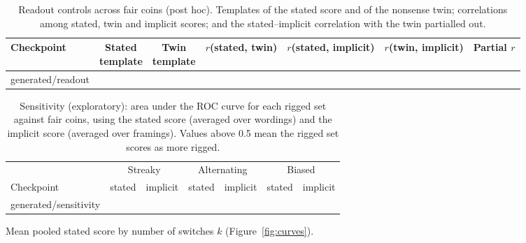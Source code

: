 \documentclass[11pt]{article}
\makeatletter
\newcommand*{\rows}[1]{\@@input #1 }
\makeatother
\begin{document}
\begin{table}[H]
\centering
\footnotesize
\caption{Readout controls across fair coins (post hoc). Templates of the stated score and of the nonsense twin; correlations among stated, twin and implicit scores; and the stated--implicit correlation with the twin partialled out.}
\label{tab:readout}
\begin{tabular}{@{}lcccccc@{}}
\toprule
Checkpoint & \makecell{Stated\\template} & \makecell{Twin\\template} & \makecell{$r$(stated,\\twin)} & \makecell{$r$(stated,\\implicit)} & \makecell{$r$(twin,\\implicit)} & \makecell{Partial\\$r$} \\
\midrule
\rows{generated/readout}
\bottomrule
\end{tabular}
\end{table}

\begin{table}[H]
\centering
\footnotesize
\caption{Sensitivity (exploratory): area under the ROC curve for each rigged set against fair coins, using the stated score (averaged over wordings) and the implicit score (averaged over framings). Values above 0.5 mean the rigged set scores as more rigged.}
\label{tab:sensitivity}
\begin{tabular}{@{}lcccccc@{}}
\toprule
 & \multicolumn{2}{c}{Streaky} & \multicolumn{2}{c}{Alternating} & \multicolumn{2}{c}{Biased} \\
\cmidrule(lr){2-3}\cmidrule(lr){4-5}\cmidrule(lr){6-7}
Checkpoint & stated & implicit & stated & implicit & stated & implicit \\
\midrule
\rows{generated/sensitivity}
\bottomrule
\end{tabular}
\end{table}

\begin{table}[H]
\centering
\footnotesize
\caption{Mean pooled stated score by number of switches $k$ (Figure~\ref{fig:curves}).}
\label{tab:curves}
\end{table}
\end{document}
